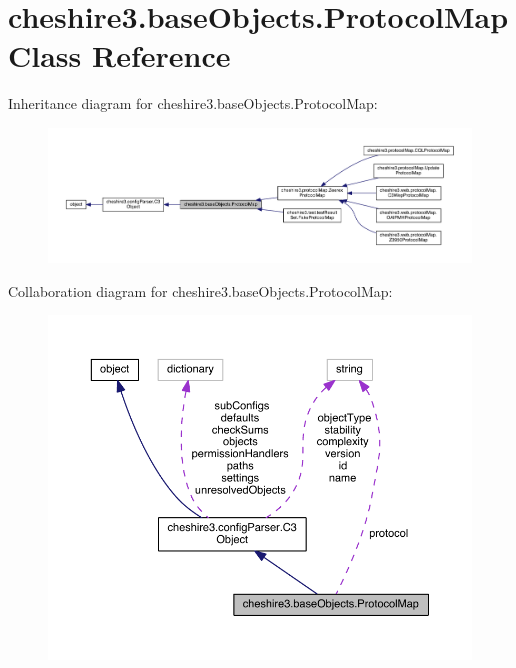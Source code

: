 \hypertarget{classcheshire3_1_1base_objects_1_1_protocol_map}{\section{cheshire3.\-base\-Objects.\-Protocol\-Map Class Reference}
\label{classcheshire3_1_1base_objects_1_1_protocol_map}
}


Inheritance diagram for cheshire3.\-base\-Objects.\-Protocol\-Map\-:
\nopagebreak
\begin{figure}[H]
\begin{center}
\leavevmode
\includegraphics[width=350pt]{classcheshire3_1_1base_objects_1_1_protocol_map__inherit__graph}
\end{center}
\end{figure}


Collaboration diagram for cheshire3.\-base\-Objects.\-Protocol\-Map\-:
\nopagebreak
\begin{figure}[H]
\begin{center}
\leavevmode
\includegraphics[width=350pt]{classcheshire3_1_1base_objects_1_1_protocol_map__coll__graph}
\end{center}
\end{figure}
